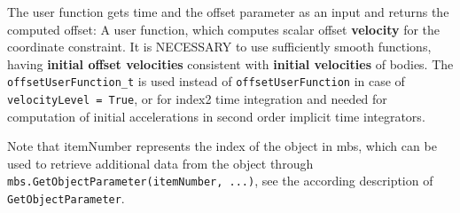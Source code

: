     The user function gets time and the offset parameter as an input and returns the computed offset:
    \finishTable
%
    A user function, which computes scalar offset {\bf velocity} for the coordinate constraint.
    It is NECESSARY to use sufficiently smooth functions, having {\bf initial offset velocities} consistent with {\bf initial velocities} of bodies.
    The \texttt{offsetUserFunction\_t} is used instead of \texttt{offsetUserFunction} in case of \texttt{velocityLevel = True}, 
    or for index2 time integration and needed for computation of initial accelerations in second order implicit time integrators.

    Note that itemNumber represents the index of the object in mbs, which can be used to retrieve additional data from the object through
    \texttt{mbs.GetObjectParameter(itemNumber, ...)}, see the according description of \texttt{GetObjectParameter}.

